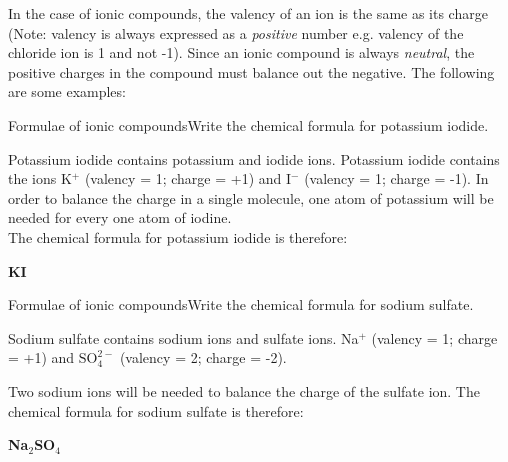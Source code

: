        \label{m38689*id144609}In the case of ionic compounds, the valency of an ion is the same as its charge (Note: valency is always expressed as a
\textsl{positive} number e.g. valency of the chloride ion is 1 and not -1). Since an ionic compound is always \textsl{neutral},
the positive charges in the compound must balance out the negative. The following are some examples:\par 
\label{m38689*secfhsst!!!underscore!!!id768}\vspace{.5cm} 
\begin{wex}{Formulae of ionic compounds}{Write the chemical formula for potassium iodide.\\}

{
Potassium iodide contains potassium and iodide ions. 
Potassium iodide contains the ions K$^+$ (valency = 1; charge = +1) and I$^-$ (valency = 1; charge = -1). In order to balance the charge in a single molecule, one atom of potassium will be needed for every one atom of iodine.
\\

The chemical formula for potassium iodide is therefore: 

\begin{center}
\textbf{KI}
\end{center}}
\end{wex}

\begin{wex}{Formulae of ionic compounds}{Write the chemical formula for sodium sulfate.\\}
{
Sodium sulfate contains sodium ions and sulfate ions.
Na$^+$ (valency = 1; charge = +1) and $\mathrm{SO}_4^{2-}$ (valency = 2; charge = -2). 

Two sodium ions will be needed to balance the charge of the sulfate ion. The chemical formula for sodium sulfate is therefore: 

\begin{center}
\textbf{Na$_2$SO$_4$}
\end{center}}
\end{wex}

